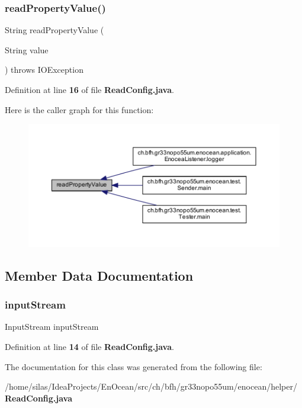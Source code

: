 \subsubsection{read\+Property\+Value()}
{\footnotesize\ttfamily String read\+Property\+Value (\begin{DoxyParamCaption}\item[{String}]{value }\end{DoxyParamCaption}) throws I\+O\+Exception}



Definition at line {\bf 16} of file {\bf Read\+Config.\+java}.

Here is the caller graph for this function\+:\nopagebreak
\begin{figure}[H]
\begin{center}
\leavevmode
\includegraphics[width=350pt]{db/d2e/classch_1_1bfh_1_1gr33nopo55um_1_1enocean_1_1helper_1_1ReadConfig_ae35dac9ca5a65b5c8b8e11dfabb13dca_icgraph}
\end{center}
\end{figure}


\subsection{Member Data Documentation}
\label{classch_1_1bfh_1_1gr33nopo55um_1_1enocean_1_1helper_1_1ReadConfig_ae6f7c8c14ebd9e2f66c0b7bf6efae2f9} 
\subsubsection{input\+Stream}
{\footnotesize\ttfamily Input\+Stream input\+Stream\hspace{0.3cm}{\ttfamily [private]}}



Definition at line {\bf 14} of file {\bf Read\+Config.\+java}.



The documentation for this class was generated from the following file\+:\begin{DoxyCompactItemize}
\item 
/home/silas/\+Idea\+Projects/\+En\+Ocean/src/ch/bfh/gr33nopo55um/enocean/helper/{\bf Read\+Config.\+java}\end{DoxyCompactItemize}
